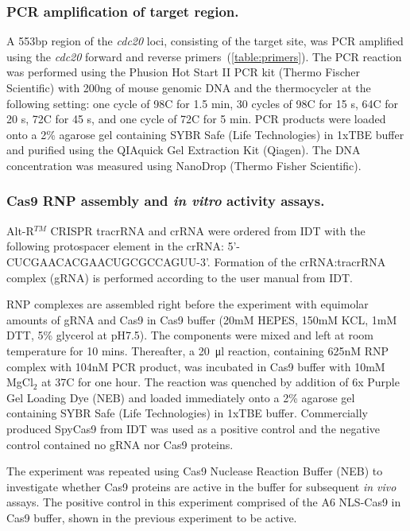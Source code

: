 \documentclass[11pt]{article}
\begin{document}
\subsubsection{PCR amplification of target region.}
A 553bp region of the \textit{cdc20} loci, consisting of the target site, was PCR amplified using the \textit{cdc20} forward and reverse primers~(\autoref{table:primers}). The PCR reaction was performed using the Phusion Hot Start II PCR kit (Thermo Fischer Scientific) with 200ng of mouse genomic DNA and the thermocycler at the following setting: one cycle of 98\degree C for 1.5 min, 30 cycles of 98\degree C for 15 s, 64\degree C for 20 s, 72\degree C for 45 s, and one cycle of 72\degree C for 5 min. PCR products were loaded onto a 2\% agarose gel containing SYBR Safe (Life Technologies) in 1xTBE buffer and purified using the QIAquick Gel Extraction Kit (Qiagen). The DNA concentration was measured using NanoDrop (Thermo Fisher Scientific).

\subsubsection{Cas9 RNP assembly and \textit{in vitro} activity assays.} \label{subsubsec:Cas9 RNP assembly}
Alt-R$^{TM}$ CRISPR tracrRNA and crRNA were ordered from IDT with the following protospacer element in the crRNA: 5'-CUCGAACACGAACUGCGCCAGUU-3'. Formation of the crRNA:tracrRNA complex (gRNA) is performed according to the user manual from IDT. 

RNP complexes are assembled right before the experiment with equimolar amounts of gRNA and Cas9 in Cas9 buffer (20mM HEPES, 150mM KCL, 1mM DTT, 5\% glycerol at pH7.5). The components were mixed and left at room temperature for 10 mins. Thereafter, a \SI{20}{\micro\litre} reaction, containing 625nM RNP complex with 104nM PCR product, was incubated in Cas9 buffer with 10mM MgCl$_{2}$ at 37\degree C for one hour. The reaction was quenched by addition of 6x Purple Gel Loading Dye (NEB) and loaded immediately onto a 2\% agarose gel containing SYBR Safe (Life Technologies) in 1xTBE buffer. Commercially produced SpyCas9 from IDT was used as a positive control and the negative control contained no gRNA nor Cas9 proteins.

The experiment was repeated using Cas9 Nuclease Reaction Buffer (NEB) to investigate whether Cas9 proteins are active in the buffer for subsequent \textit{in vivo} assays. The positive control in this experiment comprised of the A6 NLS-Cas9 in Cas9 buffer, shown in the previous experiment to be active.
\end{document}
